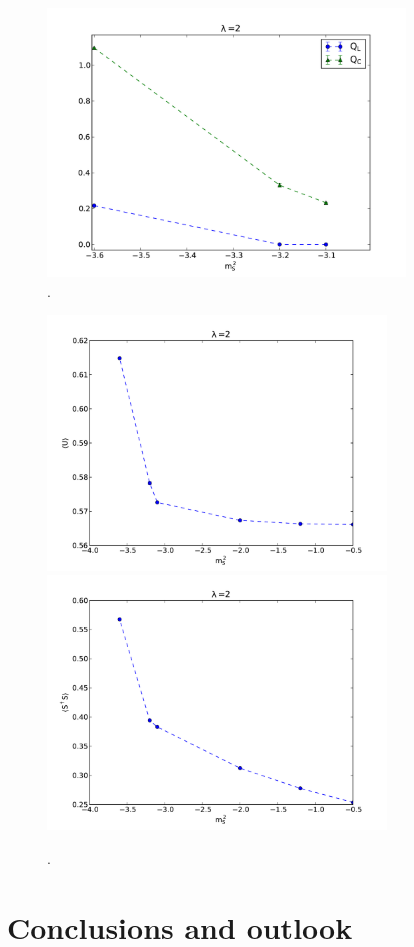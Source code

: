 \begin{figure}[thb] 
\begin{center}
  \includegraphics[width=9.5cm,clip]{pics/jump_Q}  
  \end{center}
  \caption{.}
  \label{jump_Q}
\end{figure}

\begin{figure}[thb] 
\begin{adjustwidth}{-4em}{-4em}
  \includegraphics[width=9cm,clip]{pics/jump_plaquette}\includegraphics[width=9cm,clip]{pics/jump_condensate}
\end{adjustwidth}
  \caption{.}
  \label{jump_pl_cond}
\end{figure}



\section{Conclusions and outlook}



